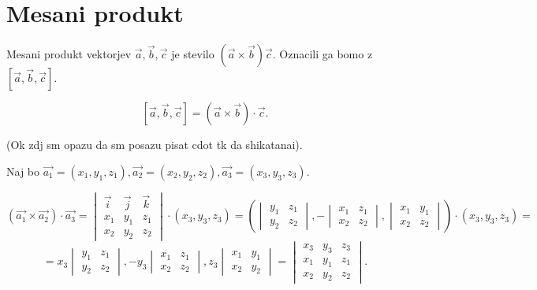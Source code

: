 \documentclass{report}
\begin{document}
\section{Mesani produkt}

Mesani produkt vektorjev $\vec{a}, \vec{b}, \vec{c}$ je stevilo $(\vec{a} \times \vec{b}) \vec{c}$. Oznacili ga bomo z $\left[\vec{a},\vec{b},\vec{c}\right]$.


\[
\left[\vec{a},\vec{b},\vec{c}\right] = (\vec{a} \times \vec{b}) \cdot \vec{c}
.\]

(Ok zdj sm opazu da sm posazu pisat cdot tk da shikatanai).


Naj bo $\vec{a_1} = (x_1, y_1, z_1), \vec{a_2} = (x_2,y_2,z_2), \vec{a_3} = (x_3,y_3,z_3)$.

\[
	(\vec{a_1} \times \vec{a_2}) \cdot \vec{a_3} =
	\begin{vmatrix}
		\vec{i} & \vec{j} & \vec{k} \\
		x_1 & y_1 & z_1 \\
		x_2 & y_2 & z_2
	\end{vmatrix} \cdot
	\left( x_3,y_3,z_3 \right)
	=
	\left(
        \begin{vmatrix}
		y_1 & z_1 \\
		y_2 & z_2
        \end{vmatrix}
	, -
	\begin{vmatrix}
		x_1 & z_1 \\
		x_2 & z_2
	\end{vmatrix}
	,
	\begin{vmatrix}
		x_1 & y_1 \\
		x_2 & z_2
	\end{vmatrix}
	\right) \cdot (x_3,y_3,z_3) =\]
	\[
	= x_3
	\begin{vmatrix}
		y_1 & z_1 \\
		y_2 & z_2
	\end{vmatrix}
	, -y_3
	\begin{vmatrix}
		x_1 & z_1 \\
		x_2 & z_2

	\end{vmatrix}
	, z_3
	\begin{vmatrix}
		x_1 & y_1 \\
		x_2 & y_2

	\end{vmatrix}
	=
	\begin{vmatrix}
		x_3 & y_3 & z_3 \\
		x_1 & y_1 & z_1 \\
		x_2 & y_2 & z_2
	\end{vmatrix}
.\]
\end{document}
